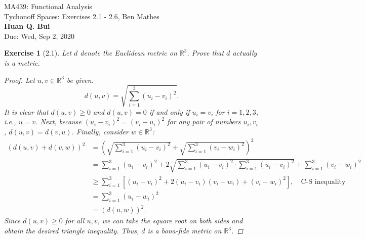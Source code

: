 \documentclass[11pt]{article}
\newtheorem{exercise}{Exercise}
\newcommand{\R}{\mathbb{R}}
\newcommand{\lp}{\left(}
\newcommand{\rp}{\right)}
\newcommand{\lb}{\left[}
\newcommand{\rb}{\right]}
\begin{document}
\begin{center}
\begin{framed}
{\Large  MA439: Functional Analysis\\
	 Tychonoff Spaces:  Exercises 2.1 - 2.6, Ben Mathes}\\
$\,$\\
{\Large \bf  Huan Q. Bui\\}
$\,$\\
{\Large Due: Wed, Sep 2, 2020}
\end{framed}
\end{center}

\begin{exercise}[2.1]
	Let $d$ denote the Euclidean metric on $\mathbb{R}^3$. Prove that $d$ actually is a metric.
	
	\begin{proof}
		Let $u,v\in \R^3$ be given. 
		\begin{equation*}
		d(u,v) = \sqrt{\sum^3_{i=1}(u_i - v_i)^2}.
		\end{equation*}
		It is clear that $d(u,v) \geq 0$ and $d(u,v) = 0$ if and only if  $u_i = v_i$ for $i=1,2,3$, i.e., $u=v$. Next, because $(u_i - v_i)^2 = (v_i - u_i)^2$ for any pair of numbers $u_i,v_i$, $d(u,v) = d(v,u)$. Finally, consider $w\in \R^3$:
			\begin{align*}
			(d(u,v) + d(v,w))^2 &= 
			\lp \sqrt{\sum^3_{i=1}(u_i - v_i)^2} + 
			\sqrt{\sum^3_{i=1}(v_i - w_i)^2} \rp^2 \\
			&= \sum^3_{i=1}(u_i - v_i)^2 + 2 \sqrt{ \sum^3_{i=1}(u_i - v_i)^2 \cdot  \sum^3_{i=1}(u_i - v_i)^2}  + \sum^3_{i=1}(v_i - w_i)^2 \\
			&\geq  \sum^3_{i=1}\lb (u_i - v_i)^2 + 2 (u_i-v_i)(v_i - w_i) + (v_i - w_i)^2 \rb, \quad \mbox{C-S inequality}  \\
			&= \sum^3_{i=1}(u_i - w_i)^2 \\
			&= (d(u,w))^2.
			\end{align*}
		Since $d(u,v) \geq 0$ for all $u,v$, we can take the square root on both sides and obtain the desired triangle inequality. Thus, $d$ is a bona-fide metric on $\R^3$.
	\end{proof}

\end{exercise}
\end{document}
